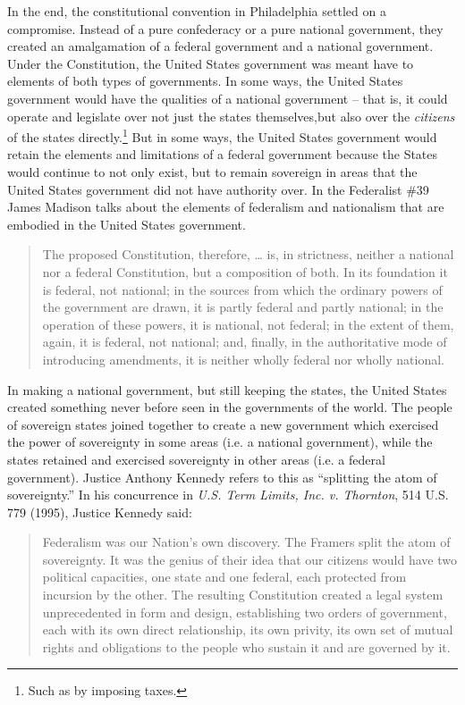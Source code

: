 In the end, the constitutional convention in Philadelphia settled on a compromise.  Instead of a pure confederacy or a pure national government, they created an amalgamation of a federal government and a national government.  Under the Constitution, the United States government was meant have to elements of both types of governments.  In some ways, the United States government would have the qualities of a national government -- that is, it could operate and legislate over not just the states themselves,but also over the \textit{citizens} of the states directly.\footnote{Such as by imposing taxes.}  But in some ways, the United States government would retain the elements and limitations of a federal government because the States would continue to not only exist, but to remain sovereign in areas that the United States government did not have authority over.  In the Federalist \#39 James Madison talks about the elements of federalism and nationalism that are embodied in the United States government.

\begin{quote}
The proposed Constitution, therefore, … is, in strictness, neither a national nor a federal Constitution, but a composition of both. 
In its foundation it is federal, not national; in the sources from which the ordinary powers of the government are drawn, it is partly federal and partly national; in the operation of these powers, it is national, not federal; in the extent of them, again, it is federal, not national; and, finally, in the authoritative mode of introducing amendments, it is neither wholly federal nor wholly national.
\end{quote}

In making a national government, but still keeping the states, the United States created something never before seen in the governments of the world.
The people of sovereign states joined together to create a new government which exercised the power of sovereignty in some areas (i.e. a national government), while the states retained and exercised sovereignty in other areas (i.e. a federal government).  Justice Anthony Kennedy refers to this as ``splitting the atom of sovereignty.''  In his concurrence in \textit{U.S. Term Limits, Inc. v. Thornton}, 514 U.S. 779 (1995), Justice Kennedy said: 

\begin{quote}
Federalism was our Nation's own discovery.  The Framers split the atom of sovereignty.  It was the genius of their idea that our citizens would have two political capacities, one state and one federal, each protected from incursion by the other.  The resulting Constitution created a legal system unprecedented in form and design, establishing two orders of government, each with its own direct relationship, its own privity, its own set of mutual rights and obligations to the people who sustain it and are governed by it.
\end {quote}

